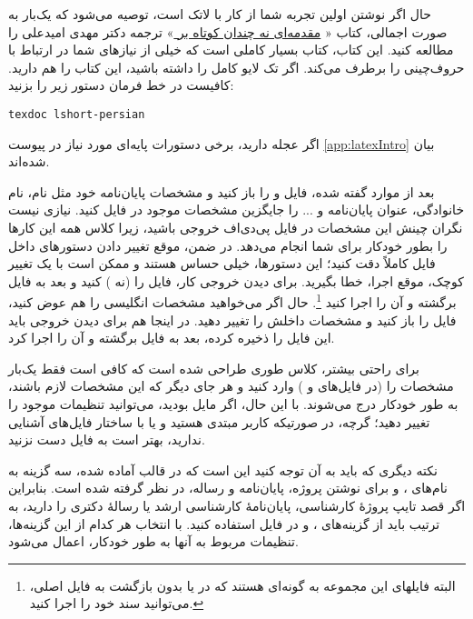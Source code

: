 حال اگر نوشتن \پ اولین تجربه شما از کار با لاتک است، توصیه می‌شود که یک‌بار به صورت اجمالی، کتاب «%
\href{http://www.tug.ctan.org/tex-archive/info/lshort/persian/lshort.pdf}{مقدمه‌ای نه چندان کوتاه بر
	\lr{\LaTeXe}}%
»
ترجمه دکتر مهدی امیدعلی را مطالعه کنید. این کتاب، کتاب بسیار کاملی است که خیلی از نیازهای شما در ارتباط با حروف‌چینی را برطرف می‌کند.
اگر تک لایو کامل را داشته باشید، این کتاب را هم دارید. کافیست در خط فرمان دستور زیر را بزنید:
\begin{latin}
	\texttt{texdoc lshort-persian}
\end{latin}
اگر عجله دارید، برخی دستورات پایه‌ای مورد نیاز در پیوست \ref{app:latexIntro} بیان شده‌اند.

بعد از موارد گفته شده، فایل
و
را باز کنید و مشخصات پایان‌نامه خود مثل نام، نام خانوادگی، عنوان پایان‌نامه و ... را جایگزین مشخصات موجود در فایل
کنید. نیازی نیست نگران چینش این مشخصات در فایل پی‌دی‌اف خروجی باشید، زیرا کلاس
همه این کارها را بطور خودکار برای شما انجام می‌دهد. در ضمن، موقع تغییر دادن دستورهای داخل فایل
کاملاً دقت کنید؛ این دستورها، خیلی حساس هستند و ممکن است با یک تغییر کوچک، موقع اجرا، خطا بگیرید. برای دیدن خروجی کار، فایل
را
(نه
)
کنید و بعد به فایل
برگشته و آن را اجرا کنید%
\footnote{
	البته فایلهای این مجموعه به گونه‌ای هستند که در
	 یا
	بدون بازگشت به فایل اصلی، می‌توانید سند خود را اجرا کنید.
}.
حال اگر می‌خواهید مشخصات انگلیسی \پ را هم عوض کنید، فایل
را باز کنید و مشخصات داخلش را تغییر دهید.
در اینجا هم برای دیدن خروجی باید این فایل را ذخیره کرده، بعد به فایل
برگشته و آن را اجرا کرد.

برای راحتی بیشتر، کلاس
طوری طراحی شده است که کافی است فقط  یک‌بار مشخصات \پ را (در فایل‌های
و
)
وارد کنید و هر جای دیگر که این مشخصات لازم باشند، به طور خودکار درج می‌شوند. با این حال، اگر مایل بودید، می‌توانید تنظیمات موجود را تغییر دهید؛ گرچه، در صورتیکه کاربر مبتدی هستید و یا با ساختار فایل‌های
آشنایی ندارید، بهتر است به فایل
دست نزنید.

نکته دیگری که باید به آن توجه کنید این است که در قالب آماده شده، سه گزینه به نام‌های
،
و
برای نوشتن پروژه، پایان‌نامه و رساله، در نظر گرفته شده است. بنابراین اگر قصد تایپ پروژهٔ کارشناسی، پایان‌نامهٔ کارشناسی ارشد یا رسالهٔ دکتری را دارید، به ترتیب باید از گزینه‌های
،
و
در فایل
استفاده کنید. با انتخاب هر کدام از این گزینه‌ها، تنظیمات مربوط به آنها به طور خودکار، اعمال می‌شود.


